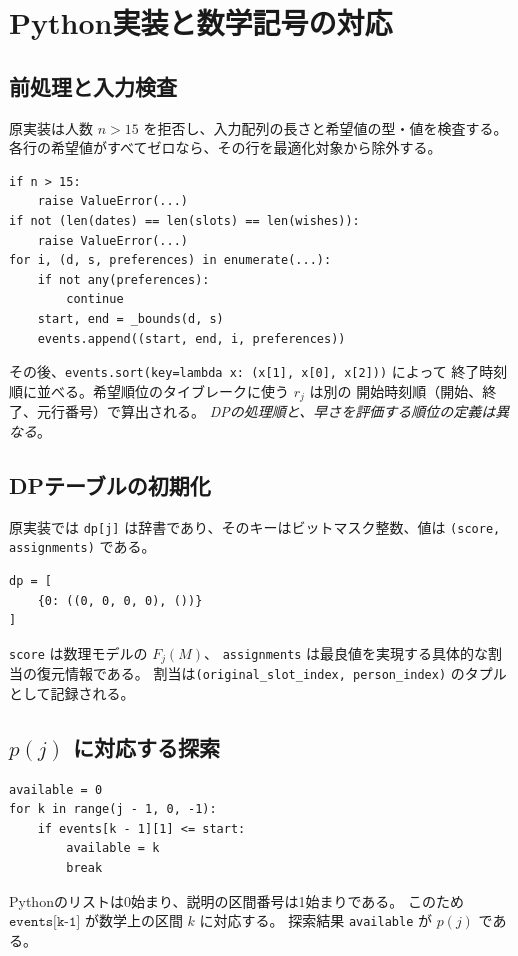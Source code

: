 \documentclass[11pt,a4paper]{ltjsarticle}
\theoremstyle{definition}
\theoremstyle{remark}
\newcommand{\code}[1]{\texttt{#1}}
\begin{document}
\section{Python実装と数学記号の対応}
\subsection{前処理と入力検査}
原実装は人数 $n>15$ を拒否し、入力配列の長さと希望値の型・値を検査する。
各行の希望値がすべてゼロなら、その行を最適化対象から除外する。
\begin{Verbatim}[fontsize=\small,frame=single]
if n > 15:
    raise ValueError(...)
if not (len(dates) == len(slots) == len(wishes)):
    raise ValueError(...)
for i, (d, s, preferences) in enumerate(...):
    if not any(preferences):
        continue
    start, end = _bounds(d, s)
    events.append((start, end, i, preferences))
\end{Verbatim}

その後、\code{events.sort(key=lambda x: (x[1], x[0], x[2]))} によって
終了時刻順に並べる。希望順位のタイブレークに使う $r_j$ は別の
開始時刻順（開始、終了、元行番号）で算出される。
\emph{DPの処理順と、早さを評価する順位の定義は異なる}。

\subsection{DPテーブルの初期化}
原実装では \code{dp[j]} は辞書であり、そのキーはビットマスク整数、値は
\code{(score, assignments)} である。
\begin{Verbatim}[fontsize=\small,frame=single]
dp = [
    {0: ((0, 0, 0, 0), ())}
]
\end{Verbatim}

\code{score} は数理モデルの $F_j(M)$、
\code{assignments} は最良値を実現する具体的な割当の復元情報である。
割当は\code{(original\_slot\_index, person\_index)} のタプルとして記録される。

\subsection{\texorpdfstring{$p(j)$}{p(j)} に対応する探索}
\begin{Verbatim}[fontsize=\small,frame=single]
available = 0
for k in range(j - 1, 0, -1):
    if events[k - 1][1] <= start:
        available = k
        break
\end{Verbatim}

Pythonのリストは0始まり、説明の区間番号は1始まりである。
このため $\code{events[k-1]}$ が数学上の区間 $k$ に対応する。
探索結果 \code{available} が $p(j)$ である。
\end{document}
